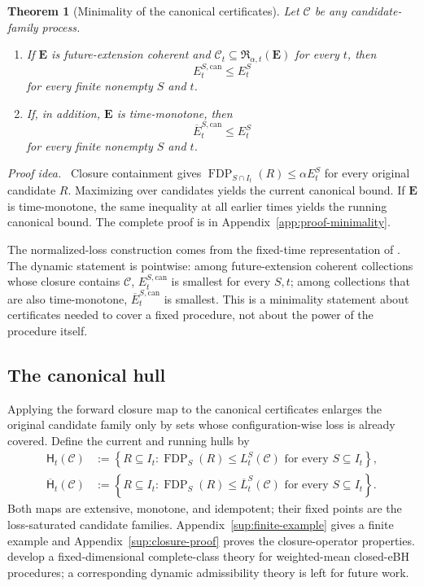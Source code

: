 \documentclass[11pt]{article}
\numberwithin{equation}{section}
\theoremstyle{plain}
\newtheorem{theorem}{Theorem}[section]
\theoremstyle{definition}
\newcommand{\C}{\mathcal C}
\newcommand{\Rfam}{\mathfrak R}
\newcommand{\Hh}{\mathsf H}
\newcommand{\Hhsup}{\overline{\mathsf H}}
\newcommand{\FDP}{\operatorname{FDP}}
\newcommand{\loss}{L}
\newcommand{\runloss}{\overline L}
\newcommand{\can}{\mathrm{can}}
\newcommand{\proofidea}{\par\medskip\noindent\textit{Proof idea.}\ }
\begin{document}
\begin{theorem}[Minimality of the canonical certificates]\label{thm:minimality}
Let $\C$ be any candidate-family process.
\begin{enumerate}
\item[(a)] If $\mathbf E$ is future-extension coherent and $\C_t\subseteq\Rfam_{\alpha,t}(\mathbf E)$ for every $t$, then
\begin{equation}\label{eq:min-current}
  E_t^{S,\can}\leq E_t^S
\end{equation}
for every finite nonempty $S$ and $t$.
\item[(b)] If, in addition, $\mathbf E$ is time-monotone, then
\begin{equation}\label{eq:min-running}
  \overline E_t^{S,\can}\leq E_t^S
\end{equation}
for every finite nonempty $S$ and $t$.
\end{enumerate}
\end{theorem}

\proofidea
Closure containment gives $\FDP_{S\cap I_t}(R)\leq\alpha E_t^S$ for every original candidate $R$. Maximizing over candidates yields the current canonical bound. If $\mathbf E$ is time-monotone, the same inequality at all earlier times yields the running canonical bound. The complete proof is in Appendix~\ref{app:proof-minimality}.

The normalized-loss construction comes from the fixed-time representation of \citet{XuEtAl2026Closure}. The dynamic statement is pointwise: among future-extension coherent collections whose closure contains $\C$, $E^{S,\can}_t$ is smallest for every $S,t$; among collections that are also time-monotone, $\overline E^{S,\can}_t$ is smallest. This is a minimality statement about certificates needed to cover a fixed procedure, not about the power of the procedure itself.

\subsection{The canonical hull}\label{sec:closure-operator}

Applying the forward closure map to the canonical certificates enlarges the original candidate family only by sets whose configuration-wise loss is already covered. Define the current and running hulls by
\begin{align}
  \Hh_t(\C)
  &:=\left\{R\subseteq I_t:
  \FDP_S(R)\leq\loss_t^S(\C)
  \text{ for every }S\subseteq I_t\right\},
  \label{eq:current-hull}\\
  \Hhsup_t(\C)
  &:=\left\{R\subseteq I_t:
  \FDP_S(R)\leq\runloss_t^S(\C)
  \text{ for every }S\subseteq I_t\right\}.
  \label{eq:running-hull}
\end{align}
Both maps are extensive, monotone, and idempotent; their fixed points are the loss-saturated candidate families. Appendix~\ref{sup:finite-example} gives a finite example and Appendix~\ref{sup:closure-proof} proves the closure-operator properties. \citet{SunWang2026Admissibility} develop a fixed-dimensional complete-class theory for weighted-mean closed-eBH procedures; a corresponding dynamic admissibility theory is left for future work.
\end{document}
